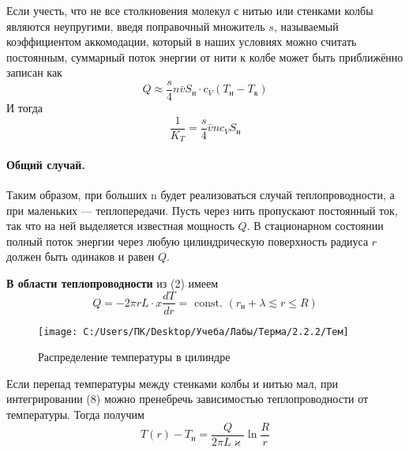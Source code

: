 \documentclass[12pt,a4paper]{article}
\begin{document}
	Если учесть, что не все столкновения молекул с нитью или стенками колбы являются неупругими, введя поправочный множитель $s$, называемый коэффициентом аккомодации, который в наших условиях можно считать постоянным, суммарный поток энергии от нити к колбе может быть приближённо записан как $$Q \approx \frac{s}{4} n \bar{v} S_{\text{н}} \cdot c_{V}\left(T_{\text{н}}-T_{\text{к}}\right)$$
	И тогда
	\begin{equation}
	\frac{1}{K_T}=\frac{s}{4} \bar{v} n c_{V} S_{\text{н}}
	\end{equation}
	
	
	
	\paragraph{Общий случай.} Таким образом, при больших n будет реализоваться случай теплопроводности, а при маленьких --- теплопередачи. Пусть через нить пропускают постоянный ток, так что на ней выделяется известная мощность $Q$. В стационарном состоянии полный поток энергии через любую цилиндрическую поверхность радиуса $r$ должен быть одинаков и равен $Q$. 
	
	\textbf{В области теплопроводности} из (2) имеем
	\begin{equation}
	Q=-2 \pi r L \cdot x \frac{d T}{d r}=\text { const. }\left(r_{\text{н}}+\lambda \lesssim r \leq R\right)
	\end{equation}
	
	\begin{wrapfigure}{r}{60mm}
		\centering
		\texttt{[image: C:/Users/ПК/Desktop/Учеба/Лабы/Терма/2.2.2/Тем]}
		\caption{Распределение температуры в цилиндре}\small
		\label{fig:}
	\end{wrapfigure}

	Если перепад температуры между стенками колбы и нитью мал, при интегрировании (8) можно пренебречь зависимостью теплопроводности от температуры. Тогда получим
	\begin{equation}
	T(r)-T_{\text{н}}=\frac{Q}{2 \pi L\varkappa} \ln \frac{R}{r}
	\end{equation}
	
\end{document}

